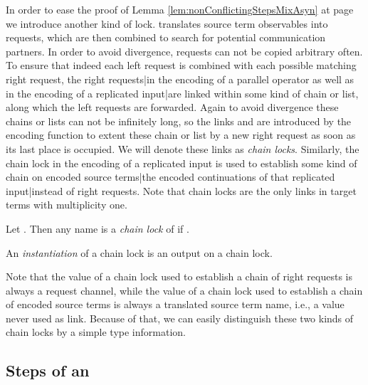 \documentclass[]{llncs}
\begin{document}
In order to ease the proof of Lemma \ref{lem:nonConflictingStepsMixAsyn} at page \pageref{lem:nonConflictingStepsMixAsyn} we introduce another kind of lock.  translates source term observables into requests, which are then combined to search for potential communication partners. In order to avoid divergence, requests can not be copied arbitrary often. To ensure that indeed each left request is combined with each possible matching right request, the right requests|in the encoding of a parallel operator as well as in the encoding of a replicated input|are linked within some kind of chain or list, along which the left requests are forwarded. Again to avoid divergence these chains or lists can not be infinitely long, so the links  and  are introduced by the encoding function to extent these chain or list by a new right request as soon as its last place is occupied. We will denote these links as \emph{chain locks}. Similarly, the chain lock  in the encoding of a replicated input is used to establish some kind of chain on encoded source terms|the encoded continuations of that replicated input|instead of right requests. Note that chain locks are the only links in target terms with multiplicity one.

\begin{definition} \label{def:chainLock}
	Let . Then any name  is a \emph{chain lock} of  if .
	
	An \emph{instantiation} of a chain lock is an output on a chain lock.
\end{definition}

Note that the value of a chain lock used to establish a chain of right requests is always a request channel, while the value of a chain lock used to establish a chain of encoded source terms is always a translated source term name, i.e., a value never used as link. Because of that, we can easily distinguish these two kinds of chain locks by a simple type information.

\subsection{Steps of an \Simulation} \label{sec:stepsSimulation}
\end{document}
